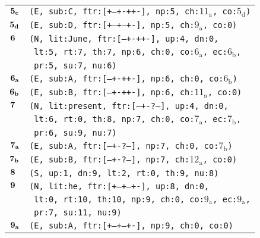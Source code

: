 \documentclass{article}
\begin{document}
\begin{minipage}{\textwidth}
{\begin{tabular}{|r|l|}
    ${\textbf{\textrm{5}}_{\textbf{\textrm{c}}}}$ & \texttt{\texttt{(E,~sub:C,~ftr:[+--+-++-],~np:5,~ch:${\textrm{11}_{\textrm{a}}}$,~co:${\textrm{5}_{\textrm{d}}}$)}} \\
    ${\textbf{\textrm{5}}_{\textbf{\textrm{d}}}}$ & \texttt{\texttt{(E,~sub:D,~ftr:[+--+--+-],~np:5,~ch:${\textrm{9}_{\textrm{a}}}$,~co:0)}} \\
    ${\textbf{\textrm{6}}_{\phantom{z}}}$ & \texttt{\texttt{(N,~lit:June,~ftr:[---+-++-],~up:4,~dn:0,}} \\
    & \texttt{\texttt{~lt:5,~rt:7,~th:7,~np:6,~ch:0,~co:${\textrm{6}_{\textrm{a}}}$,~ec:${\textrm{6}_{\textrm{b}}}$,}} \\
    & \texttt{\texttt{~pr:5,~su:7,~nu:6)}} \\
    ${\textbf{\textrm{6}}_{\textbf{\textrm{a}}}}$ & \texttt{\texttt{(E,~sub:A,~ftr:[---+-++-],~np:6,~ch:0,~co:${\textrm{6}_{\textrm{b}}}$)}} \\
    ${\textbf{\textrm{6}}_{\textbf{\textrm{b}}}}$ & \texttt{\texttt{(E,~sub:B,~ftr:[---+-++-],~np:6,~ch:${\textrm{11}_{\textrm{a}}}$,~co:0)}} \\
    ${\textbf{\textrm{7}}_{\phantom{z}}}$ & \texttt{\texttt{(N,~lit:present,~ftr:[---+-?--],~up:4,~dn:0,}} \\
    & \texttt{\texttt{~lt:6,~rt:0,~th:8,~np:7,~ch:0,~co:${\textrm{7}_{\textrm{a}}}$,~ec:${\textrm{7}_{\textrm{b}}}$,}} \\
    & \texttt{\texttt{~pr:6,~su:9,~nu:7)}} \\
    ${\textbf{\textrm{7}}_{\textbf{\textrm{a}}}}$ & \texttt{\texttt{(E,~sub:A,~ftr:[---+-?--],~np:7,~ch:0,~co:${\textrm{7}_{\textrm{b}}}$)}} \\
    ${\textbf{\textrm{7}}_{\textbf{\textrm{b}}}}$ & \texttt{\texttt{(E,~sub:B,~ftr:[---+-?--],~np:7,~ch:${\textrm{12}_{\textrm{a}}}$,~co:0)}} \\
    ${\textbf{\textrm{8}}_{\phantom{z}}}$ & \texttt{\texttt{(S,~up:1,~dn:9,~lt:2,~rt:0,~th:9,~nu:8)}} \\
    ${\textbf{\textrm{9}}_{\phantom{z}}}$ & \texttt{\texttt{(N,~lit:he,~ftr:[+--+--+-],~up:8,~dn:0,}} \\
    & \texttt{\texttt{~lt:0,~rt:10,~th:10,~np:9,~ch:0,~co:${\textrm{9}_{\textrm{a}}}$,~ec:${\textrm{9}_{\textrm{a}}}$,}} \\
    & \texttt{\texttt{~pr:7,~su:11,~nu:9)}} \\
    ${\textbf{\textrm{9}}_{\textbf{\textrm{a}}}}$ & \texttt{\texttt{(E,~sub:A,~ftr:[+--+--+-],~np:9,~ch:0,~co:0)}} \\

\end{tabular}}
\end{minipage}
\end{document}
